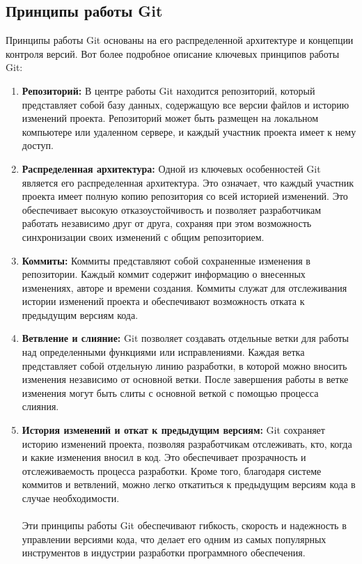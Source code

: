 \subsection{\label{subsec:ch01/sec01/sub02}Принципы работы Git} 
Принципы работы Git основаны на его распределенной архитектуре и концепции контроля версий. Вот более подробное описание ключевых принципов работы Git:
\begin{enumerate}
    \item \textbf{Репозиторий:}  В центре работы Git находится репозиторий, который представляет собой базу данных, содержащую все версии файлов и историю изменений проекта. Репозиторий может быть размещен на локальном компьютере или удаленном сервере, и каждый участник проекта имеет к нему доступ.
    \item \textbf{Распределенная архитектура:} Одной из ключевых особенностей Git является его распределенная архитектура. Это означает, что каждый участник проекта имеет полную копию репозитория со всей историей изменений. Это обеспечивает высокую отказоустойчивость и позволяет разработчикам работать независимо друг от друга, сохраняя при этом возможность синхронизации своих изменений с общим репозиторием.
    \item \textbf{Коммиты:} Коммиты представляют собой сохраненные изменения в репозитории. Каждый коммит содержит информацию о внесенных изменениях, авторе и времени создания. Коммиты служат для отслеживания истории изменений проекта и обеспечивают возможность отката к предыдущим версиям кода.
    \item \textbf{Ветвление и слияние:} Git позволяет создавать отдельные ветки для работы над определенными функциями или исправлениями. Каждая ветка представляет собой отдельную линию разработки, в которой можно вносить изменения независимо от основной ветки. После завершения работы в ветке изменения могут быть слиты с основной веткой с помощью процесса слияния.
    \item \textbf{История изменений и откат к предыдущим версиям:} Git сохраняет историю изменений проекта, позволяя разработчикам отслеживать, кто, когда и какие изменения вносил в код. Это обеспечивает прозрачность и отслеживаемость процесса разработки. Кроме того, благодаря системе коммитов и ветвлений, можно легко откатиться к предыдущим версиям кода в случае необходимости.
    \\
    \\
    Эти принципы работы Git обеспечивают гибкость, скорость и надежность в управлении версиями кода, что делает его одним из самых популярных инструментов в индустрии разработки программного обеспечения.
\end{enumerate}


